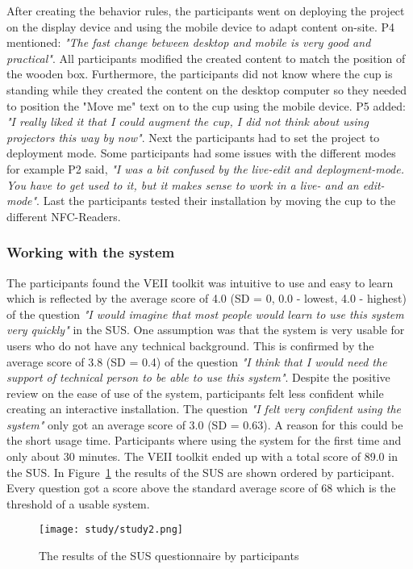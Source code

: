 After creating the behavior rules, the participants went on deploying the project on the display device and using the mobile device to adapt content on-site. P4 mentioned: \textit{"The fast change between desktop and mobile is very good and practical"}. All participants modified the created content to match the position of the wooden box. Furthermore, the participants did not know where the cup is standing while they created the content on the desktop computer so they needed to position the "Move me" text on to the cup using the mobile device. P5 added: \textit{"I really liked it that I could augment the cup, I did not think about using projectors this way by now"}. Next the participants had to set the project to deployment mode. Some participants had some issues with the different modes for example P2 said, \textit{"I was a bit confused by the live-edit and deployment-mode. You have to get used to it, but it makes sense to work in a live- and an edit-mode"}. Last the participants tested their installation by moving the cup to the different NFC-Readers.

\subsubsection{Working with the system}
The participants found the VEII toolkit was intuitive to use and easy to learn which is reflected by the average score of 4.0 (SD = 0, 0.0 - lowest, 4.0 - highest) of the question \textit{"I would imagine that most people would learn to use this system very quickly"} in the SUS. One assumption was that the system is very usable for users who do not have any technical background. This is confirmed by the average score of 3.8 (SD = 0.4) of the question \textit{"I think that I would need the support of technical person to be able to use this system"}. Despite the positive review on the ease of use of the system, participants felt less confident while creating an interactive installation. The question \textit{"I felt very confident using the system"} only got an average score of 3.0 (SD = 0.63). A reason for this could be the short usage time. Participants where using the system for the first time and only about 30 minutes. The VEII toolkit ended up with a total score of 89.0 in the SUS. In Figure~\ref{fig:studyresult2} the results of the SUS are shown ordered by participant. Every question got a score above the standard average score of 68 which is the threshold of a usable system.
\newline

\begin{figure}
  \begin{center}
    \texttt{[image: study/study2.png]}
    \caption{The results of the SUS questionnaire by participants}
    \label{fig:studyresult2}
  \end{center}
\end{figure}

